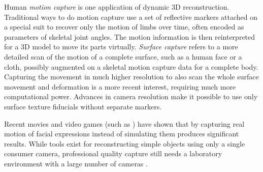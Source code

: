 
Human \emph{motion capture} is one application of dynamic 3D reconstruction.
Traditional ways to do motion capture use a set of reflective markers attached on a special suit to recover only the motion of limbs over time, often encoded as parameters of skeletal joint angles.
The motion information is then reinterpreted for a 3D model to move its parts virtually.
\emph{Surface capture} refers to a more detailed scan of the motion of a complete surface, such as a human face or a cloth, possibly augmented on a skeletal motion capture data for a complete body.
Capturing the movement in much higher resolution to also scan the whole surface movement and deformation is a more recent interest, requiring much more computational power.
Advances in camera resolution make it possible to use only surface texture fiducials without separate markers.



Recent movies and video games (such as \cite{rockstar2011noire}) have shown that by capturing real motion of facial expressions instead of simulating them produces significant results.
While tools exist for reconstructing simple objects using only a single consumer camera, professional quality capture still needs a laboratory environment with a large number of cameras \cite{winder2008technical,motionscan}.


